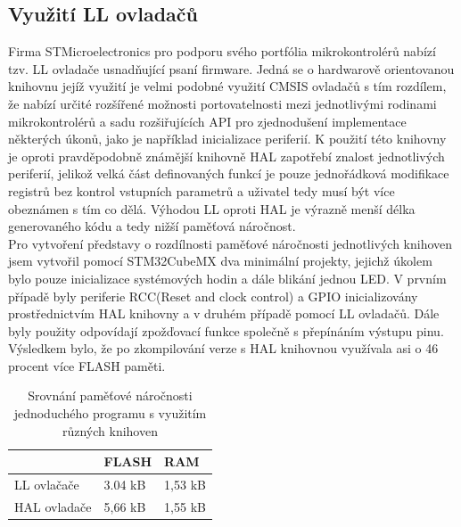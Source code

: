 \subsection{Využití LL ovladačů}
Firma STMicroelectronics pro podporu svého portfólia mikrokontrolérů nabízí tzv. LL ovladače usnadňující psaní firmware. Jedná se o hardwarově orientovanou knihovnu jejíž využití je velmi podobné využití CMSIS ovladačů s tím rozdílem, že nabízí určité rozšířené možnosti portovatelnosti mezi jednotlivými rodinami mikrokontrolérů a sadu rozšiřujících API pro zjednodušení implementace některých úkonů, jako je například inicializace periferií. K použití této knihovny je oproti pravděpodobně známější knihovně HAL zapotřebí znalost jednotlivých periferií, jelikož velká část definovaných funkcí je pouze jednořádková modifikace registrů bez kontrol vstupních parametrů a uživatel tedy musí být více obeznámen s tím co dělá. Výhodou LL oproti HAL je výrazně menší délka generovaného kódu a tedy nižší paměťová náročnost.\\

Pro vytvoření představy o rozdílnosti paměťové náročnosti jednotlivých knihoven jsem vytvořil pomocí STM32CubeMX dva minimální projekty, jejichž úkolem bylo pouze inicializace systémových hodin a dále blikání jednou LED. V prvním případě byly periferie RCC(Reset and clock control) a GPIO inicializovány prostřednictvím HAL knihovny a v druhém případě pomocí LL ovladačů. Dále byly použity odpovídají zpožďovací funkce společně s přepínáním výstupu pinu. Výsledkem bylo, že  po zkompilování verze s HAL knihovnou využívala asi o 46 procent více FLASH paměti.

\begin{table}[H]
	\begin{tabular}{l|ll}
		& FLASH   & RAM     \\ \hline
		LL ovlačače                       & 3.04 kB & 1,53 kB \\
		\multicolumn{1}{c|}{HAL ovladače} & 5,66 kB & 1,55 kB
	\end{tabular}
	\caption{Srovnání paměťové náročnosti jednoduchého programu s využitím různých knihoven}
	\label{tab:LL_HAL_MemoryUsage}
\end{table}	

